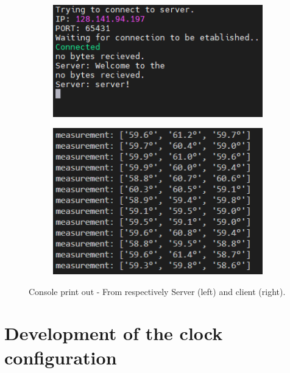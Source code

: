 \begin{figure}[H]
     \centering
     \begin{subfigure}[b]{0.49\textwidth}
         \centering
         \includegraphics[width=1\textwidth]{Graphics/print_in.PNG}
     \end{subfigure}
     \hfill
     \begin{subfigure}[b]{0.49\textwidth}
         \centering
         \includegraphics[width=1\textwidth]{Graphics/print_out.PNG}
     \end{subfigure}
     \hfill
        \caption{Console print out - From respectively Server (left) and client (right). }
        \label{fig:printss}
\end{figure}

\newpage

\section{Development of the clock configuration} \label{dev:codeclk}

